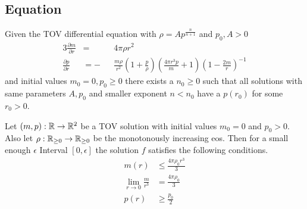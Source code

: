 \subsection{\texorpdfstring{}{TOV} Equation}
\label{subsec:5-Zeroes-TOV-Equ}
\begin{hypothesis}
	Given the \ac{TOV} differential equation with $\rho=Ap^{\frac{n}{n+1}}$ and $p_0,A>0$
	\begin{alignat}{3}
		\frac{\partial m}{\partial r} &= &&4\pi\rho r^2\\
		\frac{\partial p}{\partial r} &= -&&\frac{m\rho}{r^2}\left(1+\frac{p}{\rho}\right)\left(\frac{4\pi r^3 p}{m}+1\right)\left(1-\frac{2m}{r}\right)^{-1}
		\label{5-Zeroes-Equ-TOV-Equ}
	\end{alignat}
	and initial values $m_0=0,p_0\geq0$ there exists a $n_0\geq0$ such that all solutions with same parameters $A,p_0$ and smaller exponent $n<n_0$ have a $p(r_0)$ for some $r_0>0$.
\end{hypothesis}
\begin{lemma}
	\label{5-Zeroes-Lem-TOV-Conditions}
	Let $(m,p):\mathbb{R}\rightarrow\mathbb{R}^2$ be a \ac{TOV} solution with initial values $m_0=0$ and $p_0>0$.
	Also let $\rho:\mathbb{R}_{\geq0}\rightarrow\mathbb{R}_{\geq0}$ be the monotonously increasing \ac{eos}.
	Then for a small enough $\epsilon$ Interval $[0,\epsilon]$ the solution $f$ satisfies the following conditions.
	\begin{align}
		m(r) &\leq \frac{4\pi\rho_0 r^3}{3}\label{5-Zeroes-Equ-TOV-Conditions-1}\\
		\lim_{r\rightarrow0}\frac{m}{r^3}&=\frac{4\pi\rho_0}{3}\label{5-Zeroes-Equ-TOV-Conditions-2}\\
		p(r)&\geq\frac{p_0}{2}\label{5-Zeroes-Equ-TOV-Conditions-3}
	\end{align}
\end{lemma}
